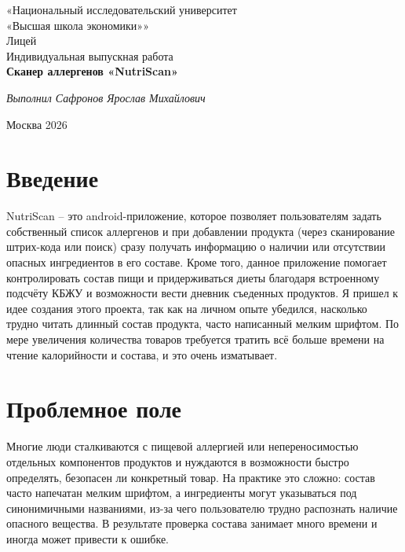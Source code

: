 \documentclass[14pt,a4paper]{extarticle}
\begin{document}
\begin{titlepage}
	\thispagestyle{empty}
	\centering
	«Национальный исследовательский университет\\
	«Высшая школа экономики»»\\[0.5cm]
	Лицей\\[5cm]
	
	Индивидуальная выпускная работа\\
	\textbf{Сканер аллергенов «NutriScan»}\\[4cm]
	
	\begin{flushright}
		\textit{Выполнил Сафронов Ярослав Михайлович\\}
	\end{flushright}
	
	\vfill
	Москва 2026
	
\end{titlepage}
\setcounter{page}{2}



\section{Введение}

NutriScan – это android-приложение, которое позволяет пользователям задать собственный список аллергенов и при добавлении продукта (через сканирование штрих-кода или поиск) сразу получать информацию о наличии или отсутствии опасных ингредиентов в его составе. Кроме того, данное приложение помогает контролировать состав пищи и придерживаться диеты благодаря встроенному подсчёту КБЖУ и возможности вести дневник съеденных продуктов. Я пришел к идее создания этого проекта, так как на личном опыте убедился, насколько трудно читать длинный состав продукта, часто написанный мелким шрифтом. По мере увеличения количества товаров требуется тратить всё больше времени на чтение калорийности и состава, и это очень изматывает.


\section{Проблемное поле}

Многие люди сталкиваются с пищевой аллергией или непереносимостью отдельных компонентов продуктов и нуждаются в возможности быстро определять, безопасен ли конкретный товар. На практике это сложно: состав часто напечатан мелким шрифтом, а ингредиенты могут указываться под синонимичными названиями, из-за чего пользователю трудно распознать наличие опасного вещества. В результате проверка состава занимает много времени и иногда может привести к ошибке. 
\end{document}
